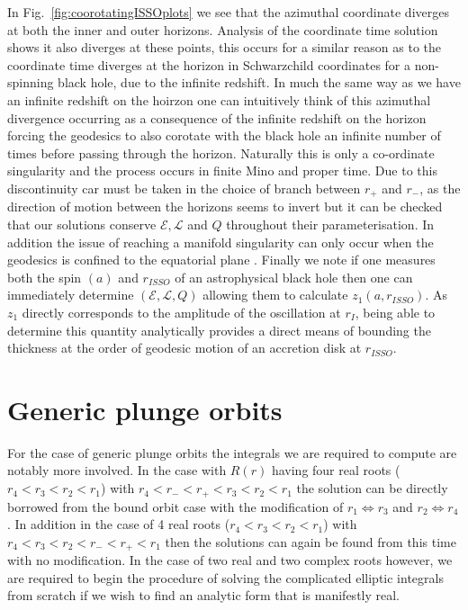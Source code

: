 \documentclass[12pt, amsmath]{revtex4-2}
\newcommand\EN{\mathcal{E}}
\newcommand\ANG{\mathcal{L}}
\begin{document}
In Fig.~\ref{fig:coorotatingISSOplots} we see that the azimuthal coordinate diverges at both the inner and outer horizons. Analysis of the coordinate time solution shows it also diverges at these points, this occurs for a similar reason as to the coordinate time diverges at the horizon in Schwarzchild coordinates for a non-spinning black hole, due to the infinite redshift. In much the same way as we have an infinite redshift on the hoirzon one can intuitively think of this azimuthal divergence occurring as a consequence of the infinite redshift on the horizon forcing the geodesics to also corotate with the black hole an infinite number of times before passing through the horizon. Naturally this is only a co-ordinate singularity and the process occurs in finite Mino and proper time. Due to this discontinuity car must be taken in the choice of branch between $r_+$ and $r_-$, as the direction of motion between the horizons seems to invert but it can be checked that our solutions conserve $\EN,\ANG$ and $Q$ throughout their parameterisation. In addition the issue of reaching a manifold singularity can only occur when the geodesics is confined to the equatorial plane  \cite{Hackmann:2010zz}. Finally we note if one measures both the spin $(a)$ and $r_{ISSO}$ of an astrophysical black hole then one can immediately determine $(\EN,\ANG,Q)$ allowing them to calculate $z_1(a,r_{ISSO})$. As $z_1$ directly corresponds to the amplitude of the oscillation at $r_I$, being able to determine this quantity analytically provides a direct means of bounding the thickness at the order of geodesic motion of an accretion disk at $r_{ISSO}$.

\section{Generic plunge orbits}\label{sec:deeplybound}
For the case of generic plunge orbits the integrals we are required to compute are notably more involved. In the case with $R(r)$ having four real roots ($r_4<r_3<r_2<r_1$) with  $r_4<r_-<r_+<r_3<r_2<r_1$  the solution can be directly borrowed from the bound orbit case \cite{vandeMeent:2019cam,Fujita:2009bp}  with the modification of $r_1 \Longleftrightarrow r_3$ and  $r_2 \Longleftrightarrow r_4$. In addition in the case of 4 real roots  ($r_4<r_3<r_2<r_1$) with $r_4<r_3<r_2<r_-<r_+<r_1$ then the solutions can again be found from \cite{vandeMeent:2019cam,Fujita:2009bp} this time with no modification. In the case of two real and two complex roots however, we are required to begin the procedure of solving the complicated elliptic integrals from scratch if we wish to find an analytic form that is manifestly real.
\end{document}
